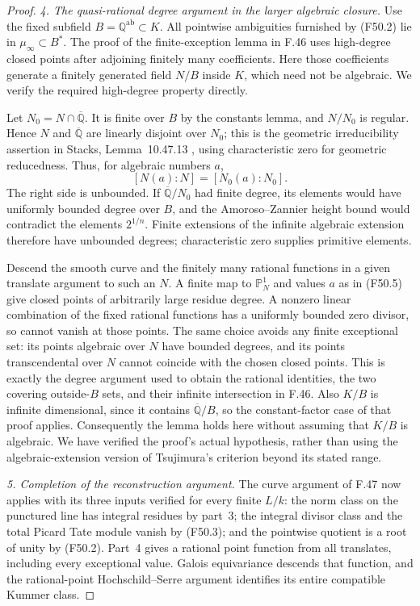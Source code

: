 \begin{proof}
\emph{4. The quasi-rational degree argument in the larger algebraic closure.}
Use the fixed subfield $B=\mathbb Q^{\mathrm{ab}}\subset K$.
All pointwise ambiguities furnished by (F50.2) lie in
$\mu_\infty\subset B^*$. The proof of the finite-exception lemma
in F.46 uses high-degree closed points after adjoining finitely
many coefficients. Here those coefficients generate a finitely
generated field $N/B$ inside $K$, which need not be algebraic.
We verify the required high-degree property directly.

Let $N_0=N\cap\overline{\mathbb Q}$. It is finite over $B$ by
the constants lemma, and $N/N_0$ is regular. Hence $N$ and
$\overline{\mathbb Q}$ are linearly disjoint over $N_0$; this is
the geometric irreducibility assertion in Stacks,
Lemma~10.47.13 \citep{StacksFGConstants}, using characteristic zero
for geometric reducedness. Thus, for algebraic numbers $a$,
\[
          [N(a):N]=[N_0(a):N_0].                           \tag{F50.5}
\]
The right side is unbounded. If
$\overline{\mathbb Q}/N_0$ had finite degree, its elements would
have uniformly bounded degree over $B$, and the Amoroso--Zannier
height bound would contradict the elements $2^{1/n}$.
Finite extensions of the infinite algebraic extension therefore
have unbounded degrees; characteristic zero supplies primitive
elements.

Descend the smooth curve and the finitely many rational functions
in a given translate argument to such an $N$. A finite map to
$\mathbb P^1_N$ and values $a$ as in (F50.5) give closed points
of arbitrarily large residue degree. A nonzero linear combination
of the fixed rational functions has a uniformly bounded zero
divisor, so cannot vanish at those points. The same choice avoids
any finite exceptional set: its points algebraic over $N$ have
bounded degrees, and its points transcendental over $N$ cannot
coincide with the chosen closed points. This is exactly the
degree argument used to obtain the rational identities, the two
covering outside-$B$ sets, and their infinite intersection in
F.46. Also $K/B$ is infinite dimensional, since it contains
$\overline{\mathbb Q}/B$, so the constant-factor case of that
proof applies. Consequently the lemma holds here without assuming
that $K/B$ is algebraic. We have verified the proof's actual
hypothesis, rather than using the algebraic-extension version of
Tsujimura's criterion beyond its stated range.

\emph{5. Completion of the reconstruction argument.}
The curve argument of F.47 now applies with its three inputs
verified for every finite $L/k$: the norm class on the punctured
line has integral residues by part~3; the integral divisor class
and the total Picard Tate module vanish by (F50.3); and the
pointwise quotient is a root of unity by (F50.2). Part~4 gives a
rational point function from all translates, including every
exceptional value. Galois equivariance descends that function,
and the rational-point Hochschild--Serre argument identifies its
entire compatible Kummer class.


\end{proof}
